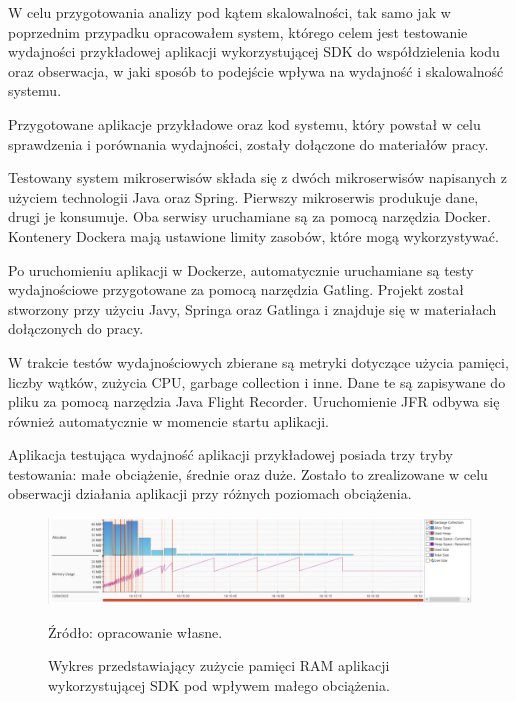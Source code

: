 \documentclass[runningheads,12pt]{llncs}
\begin{document}
W celu przygotowania analizy pod kątem skalowalności, tak samo jak w poprzednim przypadku opracowałem system, którego celem jest testowanie wydajności przykładowej aplikacji wykorzystującej SDK do współdzielenia kodu oraz obserwacja, w jaki sposób to podejście wpływa na wydajność i skalowalność systemu.

Przygotowane aplikacje przykładowe oraz kod systemu, który powstał w celu sprawdzenia i porównania wydajności, zostały dołączone do materiałów pracy.

Testowany system mikroserwisów składa się z dwóch mikroserwisów napisanych z użyciem technologii Java oraz Spring. Pierwszy mikroserwis produkuje dane, drugi je konsumuje. Oba serwisy uruchamiane są za pomocą narzędzia Docker. Kontenery Dockera mają ustawione limity zasobów, które mogą wykorzystywać.

Po uruchomieniu aplikacji w Dockerze, automatycznie uruchamiane są testy wydajnościowe przygotowane za pomocą narzędzia Gatling. Projekt został stworzony przy użyciu Javy, Springa oraz Gatlinga i znajduje się w materiałach dołączonych do pracy.

W trakcie testów wydajnościowych zbierane są metryki dotyczące użycia pamięci, liczby wątków, zużycia CPU, garbage collection i inne. Dane te są zapisywane do pliku za pomocą narzędzia Java Flight Recorder. Uruchomienie JFR odbywa się również automatycznie w momencie startu aplikacji.

Aplikacja testująca wydajność aplikacji przykładowej posiada trzy tryby testowania: małe obciążenie, średnie oraz duże. Zostało to zrealizowane w celu obserwacji działania aplikacji przy różnych poziomach obciążenia.

\newpage


\begin{figure}
    \includegraphics[width=\linewidth]{images/sdk-memory-low-graph.jpg}
    \caption{Wykres przedstawiający zużycie pamięci  RAM aplikacji wykorzystującej SDK pod wpływem małego obciążenia.} \label{fig1}
    \vspace{0.5em}
    {\small Źródło: opracowanie własne.}
\end{figure}
\end{document}
